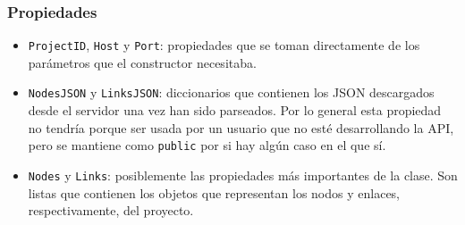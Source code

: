 \subsubsection{Propiedades}
\begin{itemize}
\item \texttt{ProjectID}, \texttt{Host} y \texttt{Port}: propiedades que se toman directamente de los parámetros que el constructor necesitaba.
\item \texttt{NodesJSON} y \texttt{LinksJSON}: diccionarios que contienen los JSON descargados desde el servidor una vez han sido parseados. Por lo general esta propiedad no tendría porque ser usada por un usuario que no esté desarrollando la API, pero se mantiene como \texttt{public} por si hay algún caso en el que sí.
\item \texttt{Nodes} y \texttt{Links}: posiblemente las propiedades más importantes de la clase. Son listas que contienen los objetos que representan los nodos y enlaces, respectivamente, del proyecto.
\end{itemize}

